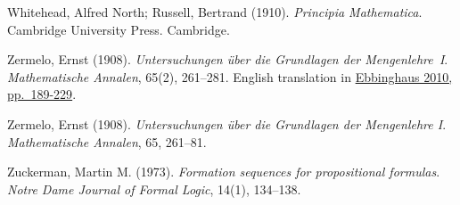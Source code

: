 \par\medskip{}\label{bib:WhiteheadRussell1910}
Whitehead, Alfred North; Russell, Bertrand (1910). \emph{Principia Mathematica}. Cambridge University Press. Cambridge.

\par\medskip{}\label{bib:Zermelo1908}
Zermelo, Ernst (1908). \emph{Untersuchungen {\"u}ber die {G}rundlagen der {M}engenlehre~{I}}. \emph{Mathematische Annalen}, 65(2), 261--281. {E}nglish translation in \hyperref[bib:Ebbinghaus2010]{Ebbinghaus 2010, pp.~189-229}.

\par\medskip{}\label{bib:Zermelo1908Untersuchungen}
Zermelo, Ernst (1908). \emph{Untersuchungen \"{u}ber die {G}rundlagen der {M}engenlehre {I}}. \emph{Mathematische Annalen}, 65, 261--81.

\par\medskip{}\label{bib:Zuckerman1973}
Zuckerman, Martin M. (1973). \emph{Formation sequences for propositional formulas}. \emph{Notre Dame Journal of Formal Logic}, 14(1), 134--138.

